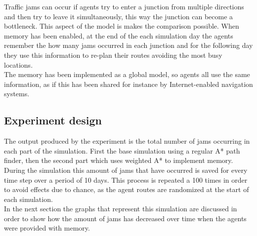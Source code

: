\documentclass[a4paper,hidelinks]{article}
\begin{document}
Traffic jams can occur if agents try to enter a junction from multiple directions and then try to leave it simultaneously, this way the junction can become a bottleneck. This aspect of the model is makes the comparison possible. When memory has been enabled, at the end of the each simulation day the agents remember the how many jams occurred in each junction and for the following day they use this information to re-plan their routes avoiding the most busy locations. \\
The memory has been implemented as a global model, so agents all use the same information, as if this has been shared for instance by Internet-enabled navigation systems.

\subsection{Experiment design}

The output produced by the experiment is the total number of jams occurring in each part of the simulation. First the base simulation using a regular A* path finder, then the second part which uses weighted A* to implement memory.
During the simulation this amount of jams that have occurred is saved for every time step over a period of 10 days. This process is repeated a 100 times in order to avoid effects due to chance, as the agent routes are randomized at the start of each simulation. \\
In the next section the graphs that represent this simulation are discussed in order to show how the amount of jams has decreased over time when the agents were provided with memory.  

%
\end{document}
